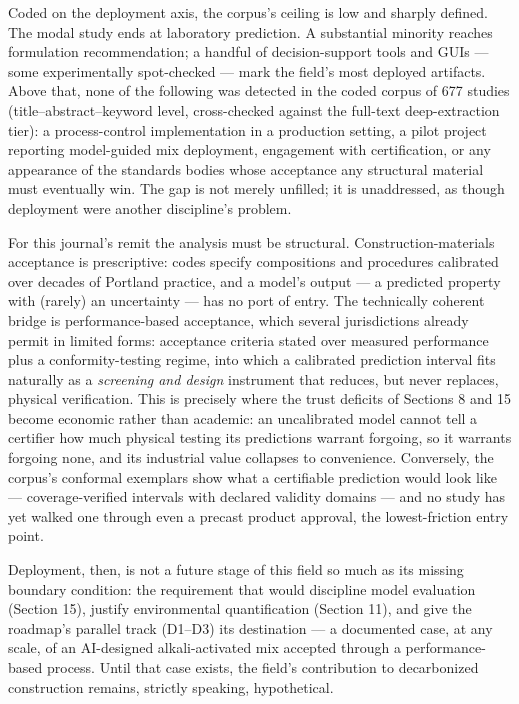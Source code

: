 \documentclass[pdflatex,sn-basic]{sn-jnl}
\begin{document}
Coded on the deployment axis, the corpus's ceiling is low and sharply defined. The modal study ends at laboratory prediction. A substantial minority reaches formulation recommendation; a handful of decision-support tools and GUIs --- some experimentally spot-checked \citep{natarajan2026,kazemi2025} --- mark the field's most deployed artifacts. Above that, none of the following was detected in the coded corpus of 677 studies (title--abstract--keyword level, cross-checked against the full-text deep-extraction tier): a process-control implementation in a production setting, a pilot project reporting model-guided mix deployment, engagement with certification, or any appearance of the standards bodies whose acceptance any structural material must eventually win. The gap is not merely unfilled; it is unaddressed, as though deployment were another discipline's problem.

For this journal's remit the analysis must be structural. Construction-materials acceptance is prescriptive: codes specify compositions and procedures calibrated over decades of Portland practice, and a model's output --- a predicted property with (rarely) an uncertainty --- has no port of entry. The technically coherent bridge is performance-based acceptance, which several jurisdictions already permit in limited forms: acceptance criteria stated over measured performance plus a conformity-testing regime, into which a calibrated prediction interval fits naturally as a \emph{screening and design} instrument that reduces, but never replaces, physical verification. This is precisely where the trust deficits of Sections 8 and 15 become economic rather than academic: an uncalibrated model cannot tell a certifier how much physical testing its predictions warrant forgoing, so it warrants forgoing none, and its industrial value collapses to convenience. Conversely, the corpus's conformal exemplars show what a certifiable prediction would look like --- coverage-verified intervals with declared validity domains --- and no study has yet walked one through even a precast product approval, the lowest-friction entry point.

Deployment, then, is not a future stage of this field so much as its missing boundary condition: the requirement that would discipline model evaluation (Section 15), justify environmental quantification (Section 11), and give the roadmap's parallel track (D1--D3) its destination --- a documented case, at any scale, of an AI-designed alkali-activated mix accepted through a performance-based process. Until that case exists, the field's contribution to decarbonized construction remains, strictly speaking, hypothetical.
\end{document}
